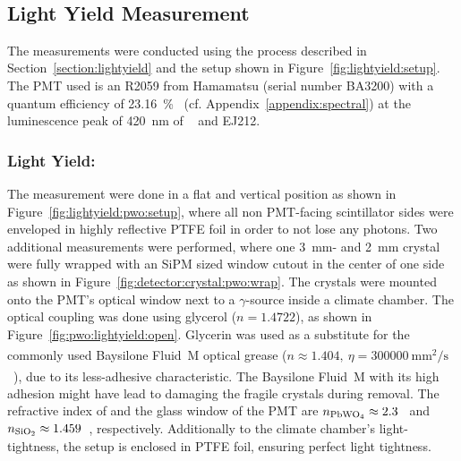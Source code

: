 \begin{figure}[h]
    \centering        
    \hspace{0.02\textwidth}
    \\
\end{figure}

\subsection{Light Yield Measurement}
The measurements were conducted using the process described in Section~\ref{section:lightyield} and the setup shown in Figure~\ref{fig:lightyield:setup}.
The PMT used is an R2059 from Hamamatsu (serial number BA3200) with a quantum efficiency of \SI{23.16}{\percent}~\cite{datasheet:hamamatsu_R2059} (cf. Appendix~\ref{appendix:spectral}) at the luminescence peak of \SI{420}{\nano\meter} of ~\cite{cms:tdr} and EJ212.

\subsubsection{Light Yield: }
The  measurement were done in a flat and vertical position as shown in Figure~\ref{fig:lightyield:pwo:setup}, where all non PMT-facing scintillator sides were enveloped in highly reflective PTFE foil in order to not lose any photons.
Two additional measurements were performed, where one \SI{3}{\milli\meter}- and \SI{2}{\milli\meter} crystal were fully wrapped with an SiPM sized window cutout in the center of one side  as shown in Figure~\ref{fig:detector:crystal:pwo:wrap}.
The  crystals were mounted onto the PMT's optical window next to a  $\gamma$-source inside a climate chamber.
The optical coupling was done using glycerol ($n=1.4722$), as shown in Figure~\ref{fig:pwo:lightyield:open}.
Glycerin was used as a substitute for the commonly used Baysilone\textsuperscript{{\textregistered}} Fluid~M optical grease ($n\approx 1.404,~\eta=\SI{300000}{\milli\meter^2\per\second}$~\cite{bayer:baysilone}), due to its less-adhesive characteristic.
The Baysilone\textsuperscript{{\textregistered}} Fluid~M with its high adhesion might have lead to damaging the fragile crystals during removal.
The refractive index of  and the  glass window of the \gls{PMT} are $n_{\ce{PbWO4}}\approx2.3$~\cite{cms:tdr} and $n_{\ce{SiO2}}\approx1.459$~\cite{Malitson:65}, respectively.
Additionally to the climate chamber's light-tightness, the setup is enclosed in PTFE foil, ensuring perfect light tightness.

